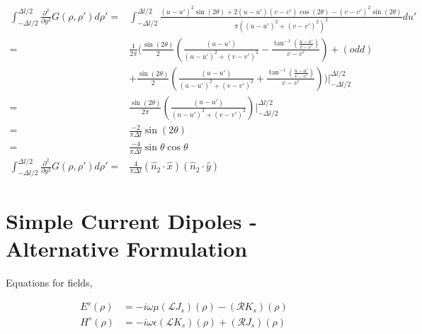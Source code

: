 \documentclass{article}
\newcommand{\0}{\varnothing}
\begin{document}
\begin{align*}
    \int_{-\Delta l/2}^{\Delta l/2}\frac{\partial^2}{\partial y^2}G(\rho, \rho')d\rho' =& \int_{-\Delta l/2}^{\Delta l/2}\frac{(u-u')^2\sin(2\theta) + 2(u-u')(v-v')\cos(2\theta)-(v-v')^2\sin(2\theta)}{\pi((u-u')^2 + (v-v')^2)^2}du'\\
    =& \frac{1}{2\pi}(\frac{\sin(2\theta)}{2}\left(\frac{(u-u')}{(u-u')^2+(v-v')^2} - \frac{\tan^{-1}(\frac{u-u'}{v-v'})}{v-v'}\right) + (odd)\\
    &+ \frac{\sin(2\theta)}{2}\left(\frac{(u-u')}{(u-u')^2+(v-v')^2} + \frac{\tan^{-1}(\frac{u-u'}{v-v'})}{v-v'}\right))|_{-\Delta l/2}^{\Delta l/2}\\
    =& \frac{\sin(2\theta)}{2\pi}\left(\frac{(u-u')}{(u-u')^2+(v-v')^2}\right)|_{-\Delta l/2}^{\Delta l/2}\\
    =& \frac{-2}{\pi\Delta l}\sin(2\theta)\\
    =& \frac{-4}{\pi\Delta l}\sin\theta\cos\theta\\
    \int_{-\Delta l/2}^{\Delta l/2}\frac{\partial^2}{\partial y^2}G(\rho, \rho')d\rho'=& \frac{4}{\pi\Delta l}(\hat{n}_2\cdot\hat{x})(\hat{n}_2\cdot\hat{y})
\end{align*}



\newpage
\section{Simple Current Dipoles - Alternative Formulation}

Equations for fields,

\begin{align*}
    E^s(\rho) &= -i\omega\mu(\mathcal{L}J_s)(\rho) - (\mathcal{R}K_s)(\rho)\\
    H^s(\rho) &= -i\omega\epsilon(\mathcal{L}K_s)(\rho) + (\mathcal{R}J_s)(\rho)
\end{align*}
\end{document}

